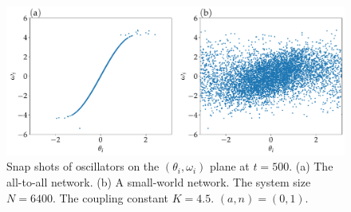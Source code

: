 \begin{figure}[t]
    \centering
    \includegraphics[width=\textwidth]{figs/all_sw_snap.pdf}
    \caption{
      Snap shots of oscillators on the $(\theta_{i},\omega_{i})$ plane
      at $t=500$.
      (a) The all-to-all network.  (b) A small-world network.
      The system size $N=6400$. The coupling constant $K=4.5$.
      $(a,n)=(0,1)$.
    }
    \label{fig:all-sw-scatter}
\end{figure}



